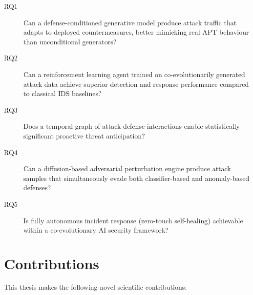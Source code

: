 \begin{description}
  \item[RQ1] Can a defense-conditioned generative model produce attack traffic
    that adapts to deployed countermeasures, better mimicking real APT behaviour
    than unconditional generators?

  \item[RQ2] Can a reinforcement learning agent trained on co-evolutionarily
    generated attack data achieve superior detection and response performance
    compared to classical IDS baselines?

  \item[RQ3] Does a temporal graph of attack-defense interactions enable
    statistically significant proactive threat anticipation?

  \item[RQ4] Can a diffusion-based adversarial perturbation engine produce
    attack samples that simultaneously evade both classifier-based and
    anomaly-based defenses?

  \item[RQ5] Is fully autonomous incident response (zero-touch self-healing)
    achievable within a co-evolutionary AI security framework?
\end{description}

\section{Contributions}

This thesis makes the following novel scientific contributions:

